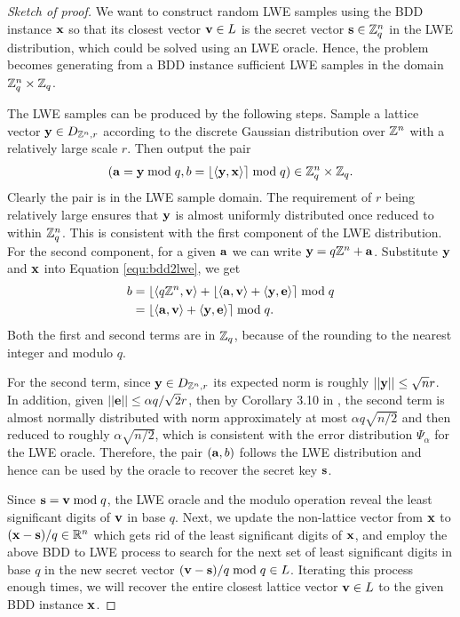 \documentclass[../main.tex]{subfiles}
\begin{document}
\begin{proof}[Sketch of proof]
We want to construct random LWE samples using the BDD instance $\mathbf{x}$ so that its closest vector $\mathbf{v}\in L$ is the secret vector $\mathbf{s} \in \mathbb{Z}_q^n$ in the LWE distribution, which could be solved using an LWE oracle. Hence, the problem becomes generating from a BDD instance sufficient LWE samples in the domain $\mathbb{Z}_q^n \times \mathbb{Z}_q$. %

The LWE samples can be produced by the following steps. Sample a lattice vector $\mathbf{y} \in D_{\mathbb{Z}^n, r}$ according to the discrete Gaussian distribution over $\mathbb{Z}^n$ with a relatively large scale $r$. Then output the pair
\begin{align}
\label{equ:bdd2lwe}
    (\mathbf{a}=\mathbf{y} \bmod q, b=\lfloor \langle \mathbf{y}, \mathbf{x}\rangle \rceil \bmod q) \in \mathbb{Z}_q^n \times \mathbb{Z}_q.
\end{align}
Clearly the pair is in the LWE sample domain. The requirement of $r$ being relatively large ensures that $\mathbf{y}$ is almost uniformly distributed once reduced to within $\mathbb{Z}_q^n$. This is consistent with the first component of the LWE distribution. 
For the second component, for a given $\mathbf{a}$ we can write $\mathbf{y}=q \mathbb{Z}^n + \mathbf{a}$. Substitute $\mathbf{y}$ and $\mathbf{x}$ into Equation \ref{equ:bdd2lwe}, we get 
\begin{align*}
    b &= \lfloor \langle q\mathbb{Z}^n, \mathbf{v} \rangle + \lfloor \langle \mathbf{a}, \mathbf{v} \rangle + \langle \mathbf{y}, \mathbf{e}\rangle \rceil \bmod q\\
    &=\lfloor \langle \mathbf{a}, \mathbf{v} \rangle + \langle \mathbf{y}, \mathbf{e}\rangle \rceil \bmod q.
\end{align*}
Both the first and second terms are in $\mathbb{Z}_q$, because of the rounding to the nearest integer and modulo $q$. 

For the second term, since $\mathbf{y} \in D_{\mathbb{Z}^n, r}$ its expected norm is roughly $||\mathbf{y}|| \le \sqrt{n}r$. In addition, given $||\mathbf{e}||\le \alpha q / \sqrt{2}r$, then by Corollary 3.10 in \cite{regev2009lattices}, the second term is almost normally distributed with norm approximately at most $\alpha q \sqrt{n/2}$ and then reduced to roughly $\alpha \sqrt{n/2}$, which is consistent with the error distribution $\Psi_{\alpha}$ for the LWE oracle. Therefore, the pair $(\mathbf{a},b)$ follows the LWE distribution and hence can be used by the oracle to recover the secret key $\mathbf{s}$.

Since $\mathbf{s}=\mathbf{v} \bmod q$, the LWE oracle and the modulo operation reveal the least significant digits of $\mathbf{v}$ in base $q$. Next, we update the non-lattice vector from $\mathbf{x}$ to $(\mathbf{x} - \mathbf{s})/q \in \mathbb{R}^n$ which gets rid of the least significant digits of $\mathbf{x}$, and employ the above BDD to LWE process to search for the next set of least significant digits in base $q$ in the new secret vector $(\mathbf{v} - \mathbf{s})/q  \bmod q \in L$. %
Iterating this process enough times, we will recover the entire closest lattice vector $\mathbf{v} \in L$ to the given BDD instance $\mathbf{x}$. 
\end{proof}
\end{document}
